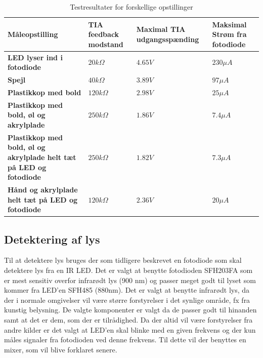 \documentclass[HardwareDesign/HardwareDesign_main.tex]{subfiles}
\begin{document}
{\begin{table}[H]
\begin{tabular}{|L{0.25\textwidth}|L{0.25\textwidth}|L{0.25\textwidth}|L{0.25\textwidth}|}
\hline
\textbf{Måleopstilling} & \textbf{TIA feedback modstand} & \textbf{Maximal TIA udgangsspænding} & \textbf{Maksimal Strøm fra fotodiode} \\ \hline
\textbf{LED lyser ind i fotodiode} & $20\si{k\Omega}$ & $4.65\si{V}$ & $230\si{\mu A}$ \\ \hline
\textbf{Spejl} & $40\si{k\Omega}$ & $3.89\si{V}$ & $97\si{\mu A}$ \\ \hline
\textbf{Plastikkop med bold} & $120\si{k\Omega}$ & $2.98\si{V}$ & $25\si{\mu A}$ \\ \hline
\textbf{Plastikkop med bold, øl og akrylplade} & $250\si{k\Omega}$ & $1.86\si{V}$ & $7.4\si{\mu A}$ \\ \hline
\textbf{Plastikkop med bold, øl og akrylplade helt tæt på LED og fotodiode} & $250\si{k\Omega}$ & $1.82\si{V}$ & $7.3\si{\mu A}$ \\ \hline
\textbf{Hånd og akrylplade helt tæt på LED og fotodiode} & $120\si{k\Omega}$ & $2.36\si{V}$ & $20\si{\mu A}$ \\ \hline
\end{tabular}
\caption{Testresultater for forskellige opstillinger}
\label{tab:CupSensorCurrentTest}
\end{table}
}
\fi


\subsection{Detektering af lys}
Til at detektere lys bruges der som tidligere beskrevet en fotodiode som skal detektere lys fra en IR LED. 
Det er valgt at benytte fotodioden SFH203FA som er mest sensitiv overfor infrarødt lys (900 nm)\autocite[2]{SFH203FA} og passer meget godt til lyset som kommer fra LED'en SFH485 (880nm)\autocite[3]{SFH485}. Det er valgt at benytte infrarødt lys, da der i normale omgivelser vil være større forstyrelser i det synlige område, fx fra kunstig belysning. De valgte komponenter er valgt da de passer godt til hinanden samt at det er dem, som der er tilrådighed. 
Da der altid vil være forstyrelser fra andre kilder er det valgt at LED'en skal blinke med en given frekvens og der kun måles signaler fra fotodioden ved denne frekvens. Til dette vil der benyttes en mixer, som vil blive forklaret senere. 
\end{document}
